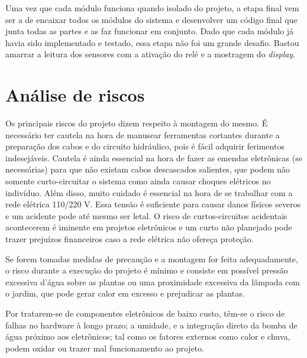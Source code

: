 \documentclass[a4paper,12pt]{article}
\begin{document}
    Uma vez que cada módulo funciona quando isolado do projeto, a etapa final vem ser a de encaixar todos os módulos do sistema e desenvolver um código final que junta todas as partes e as faz funcionar em conjunto. Dado que cada módulo já havia sido implementado e testado, essa etapa não foi um grande desafio. Bastou amarrar a leitura dos sensores com a ativação do relé e a mostragem do \textit{display}.



\section{Análise de riscos}
Os principais riscos do projeto dizem respeito à montagem do mesmo. É necessário ter cautela na hora de manusear ferramentas cortantes durante a preparação dos cabos e do circuito hidráulico, pois é fácil adquirir ferimentos indesejáveis. Cautela é ainda essencial na hora de fazer as emendas eletrônicas (se necessárias) para que não existam cabos descascados salientes, que podem não somente curto-circuitar o sistema como ainda causar choques elétricos no indivíduo. Além disso, muito cuidado é essencial na hora de se trabalhar com a rede elétrica 110/220 V. Essa tensão é suficiente para causar danos físicos severos e um acidente pode até mesmo ser letal. \cite{halliday2008eletro} O risco de curtos-circuitos acidentais acontecerem é iminente em projetos eletrônicos e um curto não planejado pode trazer prejuízos financeiros caso a rede elétrica não ofereça proteção.

    Se forem tomadas medidas de precaução e a montagem for feita adequadamente, o risco durante a execução do projeto é mínimo e consiste em possível pressão excessiva d’água sobre as plantas ou uma proximidade excessiva da lâmpada com o jardim, que pode gerar calor em excesso e prejudicar as plantas.

    Por tratarem-se de componentes eletrônicos de baixo custo, têm-se o risco de falhas no hardware à longo prazo; a umidade, e a integração direto da bomba de água próximo aos eletrônicos; tal como os fatores externos como calor e chuva, podem oxidar ou trazer mal funcionamento ao projeto.
\end{document}
